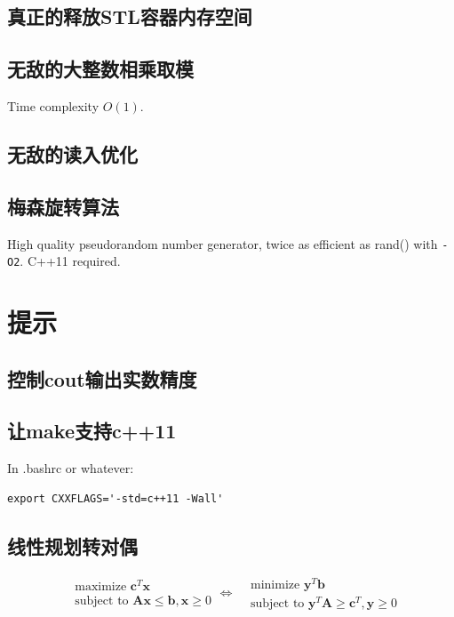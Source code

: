 \documentclass[landscape,a4paper]{article}
\begin{document}
\begin{spacing}{0.3}
\begin{multicols}{2}
\subsection{真正的释放STL容器内存空间}

\subsection{无敌的大整数相乘取模}
Time complexity $O(1)$.

\subsection{无敌的读入优化}

\subsection{梅森旋转算法}
High quality pseudorandom number generator, twice as efficient as rand() with \texttt{-O2}.
C++11 required.


\section{提示}

\subsection{控制cout输出实数精度}

\subsection{让make支持c++11}
In .bashrc or whatever:
\begin{verbatim}
export CXXFLAGS='-std=c++11 -Wall'
\end{verbatim}

\subsection{线性规划转对偶}

\begin{equation*}
\begin{aligned}
&\text{maximize }\mathbf{c}^{T}\mathbf{x}\\
&\text{subject to }\mathbf{A}\mathbf{x} \leq \mathbf{b}, \mathbf{x} \geq 0
\end{aligned}
\Longleftrightarrow
\begin{aligned}
&\text{minimize }\mathbf{y}^{T}\mathbf{b}\\
&\text{subject to }\mathbf{y}^{T}\mathbf{A} \geq \mathbf{c}^{T}, \mathbf{y} \geq 0
\end{aligned}
\end{equation*}


\end{multicols}
\end{spacing}
\end{document}
